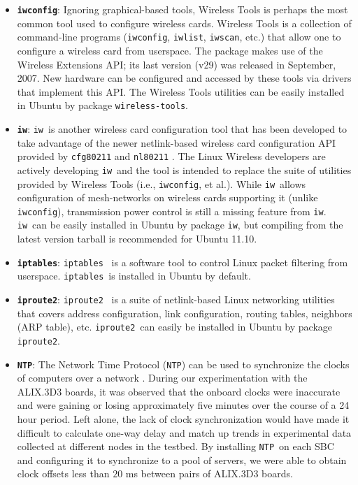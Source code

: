 \documentclass{article}
\newenvironment{myitemize}{
	\begin{itemize}
	\setlength{\itemsep}{1pt}
	\setlength{\parskip}{0pt}
	\setlength{\parsep}{0pt}}{\end{itemize}
	}
\newcommand{\iproute}{\texttt{iproute2}}
\newcommand{\iptables}{\texttt{iptables}}
\newcommand{\iwconfig}{\texttt{iwconfig}}
\newcommand{\iwlist}{\texttt{iwlist}}
\newcommand{\iwscan}{\texttt{iwscan}}
\newcommand{\iw}{\texttt{iw}}
\newcommand{\ntp}{\texttt{NTP}}
\newcommand{\wirelesstools}{\texttt{wireless-tools}}
\begin{document}
\begin{myitemize}

\item \textbf{\iwconfig}:
  Ignoring graphical-based tools, Wireless Tools \cite{wt} is perhaps the most common tool used
to configure wireless cards.
  Wireless Tools is a collection of command-line programs (\iwconfig, \iwlist, \iwscan, etc.) that allow one to configure a wireless card from userspace.
  The package makes use of the Wireless Extensions API; its last version (v29) was released in September, 2007.
  New hardware can be configured and accessed by these tools via drivers that implement this API.
  The Wireless Tools utilities can be easily installed in Ubuntu by package \wirelesstools.

\item \textbf{\iw}:
  \iw\ is another wireless card configuration tool that has been developed to take advantage of the newer netlink-based wireless card configuration API provided by \texttt{cfg80211} and \texttt{nl80211} \cite{iw}.
  The Linux Wireless developers are actively developing \iw\ and the tool is intended to replace the suite of utilities provided by Wireless Tools (i.e., \iwconfig, et al.).
  While \iw\ allows configuration of mesh-networks on wireless cards supporting it (unlike \iwconfig), transmission power control is still a missing feature from \iw.
  \iw\ can be easily installed in Ubuntu by package \iw, but compiling from the latest version tarball is recommended for Ubuntu 11.10.

\item \textbf{\iptables}:
  \iptables\ \cite{iptables} is a software tool to control Linux packet filtering from userspace.
  \iptables\ is installed in Ubuntu by default.

\item \textbf{\iproute}:
  \iproute\ \cite{iproute2} is a suite of netlink-based Linux networking utilities that covers address configuration, link configuration, routing tables, neighbors (ARP table), etc.
  \iproute\ can easily be installed in Ubuntu by package \iproute.

\item \textbf{\ntp}:
  The Network Time Protocol (\ntp) can be used to synchronize the clocks of computers over a network \cite{ntp}.
  During our experimentation with the ALIX.3D3 boards, it was observed that the onboard clocks were inaccurate and were gaining or losing approximately five minutes over the course of a 24 hour period.
  Left alone, the lack of clock synchronization would have made it difficult to calculate one-way delay and match up trends in experimental data collected at different nodes in the testbed.
  By installing \ntp\ on each SBC and configuring it to synchronize to a pool of servers, we were able to obtain clock offsets less than \(20\) ms between pairs of ALIX.3D3 boards.


\end{myitemize}
\end{document}
